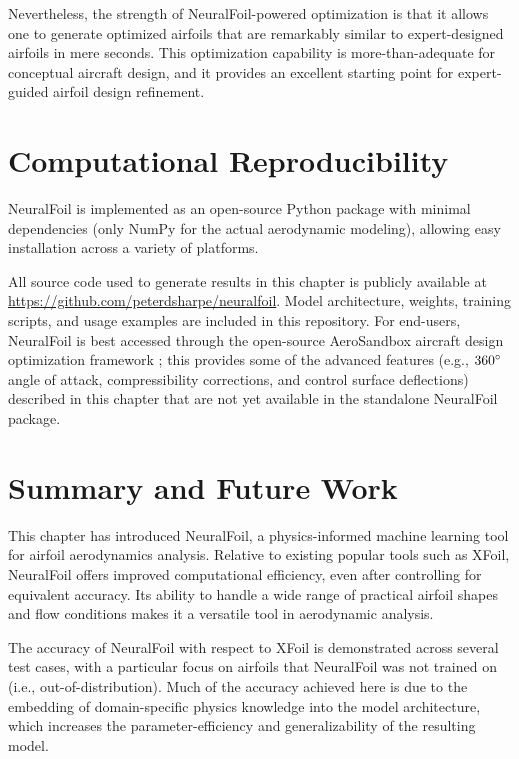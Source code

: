     Nevertheless, the strength of NeuralFoil-powered optimization is that it allows one to generate optimized airfoils that are remarkably similar to expert-designed airfoils in mere seconds. This optimization capability is more-than-adequate for conceptual aircraft design, and it provides an excellent starting point for expert-guided airfoil design refinement.


    \section{Computational Reproducibility}
    \label{sec:nf-reproducibility}

    NeuralFoil is implemented as an open-source Python package with minimal dependencies (only NumPy \cite{harris_array_2020} for the actual aerodynamic modeling), allowing easy installation across a variety of platforms.

    All source code used to generate results in this chapter is publicly available at \url{https://github.com/peterdsharpe/neuralfoil}. Model architecture, weights, training scripts, and usage examples are included in this repository.
    For end-users, NeuralFoil is best accessed through the open-source AeroSandbox aircraft design optimization framework \cite{sharpe_aerosandbox_2021}; this provides some of the advanced features (e.g., $360\degree$ angle of attack, compressibility corrections, and control surface deflections) described in this chapter that are not yet available in the standalone NeuralFoil package.


    \section{Summary and Future Work}
    \label{sec:conclusion}

    This chapter has introduced NeuralFoil, a physics-informed machine learning tool for airfoil aerodynamics analysis. Relative to existing popular tools such as XFoil, NeuralFoil offers improved computational efficiency, even after controlling for equivalent accuracy. Its ability to handle a wide range of practical airfoil shapes and flow conditions makes it a versatile tool in aerodynamic analysis.

    The accuracy of NeuralFoil with respect to XFoil is demonstrated across several test cases, with a particular focus on airfoils that NeuralFoil was not trained on (i.e., out-of-distribution). Much of the accuracy achieved here is due to the embedding of domain-specific physics knowledge into the model architecture, which increases the parameter-efficiency and generalizability of the resulting model.

